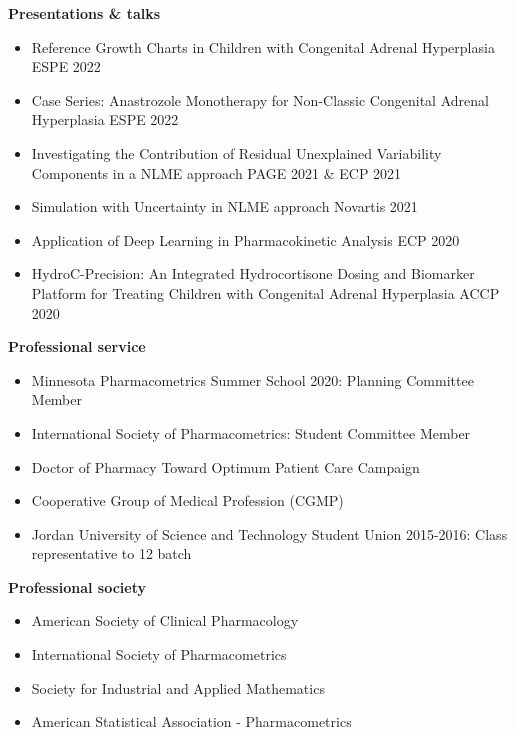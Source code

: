 \documentclass[a4paper,11pt]{article}
\begin{document}
\printbibliography[title=Posters \& abstracts,keyword=poster]
\newpage
{\centering\textbf{Presentations \& talks}}
\begin{itemize}
    \item Reference Growth Charts in Children with Congenital Adrenal Hyperplasia \hfill ESPE 2022
    \item Case Series: Anastrozole Monotherapy for Non-Classic Congenital Adrenal Hyperplasia \hfill ESPE 2022
    \item Investigating the Contribution of Residual Unexplained Variability Components in a NLME approach \hfill  PAGE 2021 \& ECP 2021
    \item Simulation with Uncertainty in NLME approach \hfill Novartis 2021
    \item Application of Deep Learning in Pharmacokinetic Analysis \hfill ECP 2020
    \item HydroC-Precision: An Integrated Hydrocortisone Dosing and Biomarker Platform for Treating Children with Congenital Adrenal Hyperplasia \hfill ACCP 2020
\end{itemize}
\textbf{Professional service}
\begin{itemize}
\item Minnesota Pharmacometrics Summer School 2020: Planning Committee Member
\item International Society of Pharmacometrics: Student Committee Member
\item Doctor of Pharmacy Toward Optimum Patient Care Campaign
\item Cooperative Group of Medical Profession (CGMP)
\item  Jordan University of Science and Technology Student Union 2015-2016: Class representative to 12 batch
\end{itemize}
\textbf{Professional society}
\begin{itemize}
    \item American Society of Clinical Pharmacology
    \item International Society of Pharmacometrics
    \item Society for Industrial and Applied Mathematics
    \item American Statistical Association - Pharmacometrics
\end{itemize}
\end{document}
